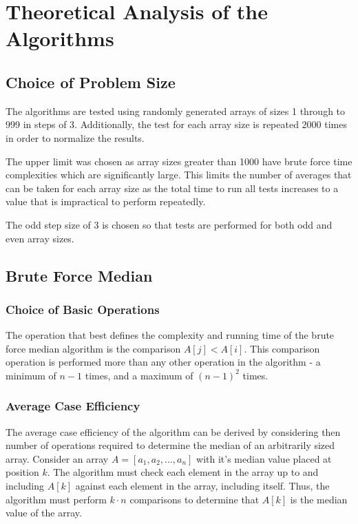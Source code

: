 \documentclass{article}
\begin{document}
\section{Theoretical Analysis of the Algorithms}
    \subsection{Choice of Problem Size}
        The algorithms are tested using randomly generated arrays of sizes 1 through to 999 in steps of 3. Additionally, the test for each array size is repeated 2000 times in order to normalize the results.

        The upper limit was chosen as array sizes greater than 1000 have brute force time complexities which are significantly large. This limits the number of averages that can be taken for each array size as the total time to run all tests increases to a value that is impractical to perform repeatedly. 

        The odd step size of 3 is chosen so that tests are performed for both odd and even array sizes. 
    \subsection{Brute Force Median}
        \subsubsection{Choice of Basic Operations}
            The operation that best defines the complexity and running time of the brute force median algorithm is the comparison $A[j] < A[i]$. This comparison operation is performed more than any other operation in the algorithm - a minimum of $n - 1$ times, and a maximum of $(n - 1)^2$ times.

        \subsubsection{Average Case Efficiency}
            The average case efficiency of the algorithm can be derived by considering then number of operations required to determine the median of an arbitrarily sized array. Consider an array $A = [a_1, a_2, ..., a_n]$ with it's median value placed at position $k$. The algorithm must check each element in the array up to and including $A[k]$ against each element in the array, including itself. Thus, the algorithm must perform $k \cdot n$ comparisons to determine that $A[k]$ is the median value of the array.
\end{document}
